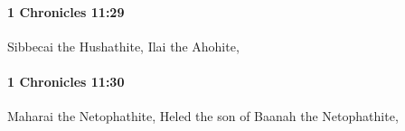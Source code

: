 		\paragraph{1 Chronicles 11:29} %
			\label{1CHRONICLES-11-29}

			Sibbecai the Hushathite, Ilai the Ahohite,


		\paragraph{1 Chronicles 11:30} %
			\label{1CHRONICLES-11-30}

			Maharai the Netophathite, Heled the son of Baanah the Netophathite,


